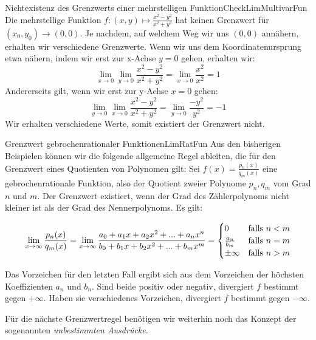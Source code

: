 \begin{example}{Nichtexistenz des Grenzwerts einer mehrstelligen Funktion}{CheckLimMultivarFun}
    Die mehrstellige Funktion $f: (x,y) \mapsto \frac{x^2-y^2}{x^2+y^2}$ hat keinen Grenzwert für $(x_0,y_0) \to (0,0)$. Je nachdem, auf welchem Weg wir uns $(0,0)$ annähern, erhalten wir verschiedene Grenzwerte. Wenn wir uns dem Koordinatenursprung etwa nähern, indem wir erst zur x-Achse $y=0$ gehen, erhalten wir:
    $$
    \lim\limits_{x\to 0} \lim\limits_{y\to 0} \frac{x^2-y^2}{x^2+y^2} = \lim\limits_{x\to 0} \frac{x^2}{x^2} = 1
    $$
    Andererseits gilt, wenn wir erst zur y-Achse $x=0$ gehen:
    $$
    \lim\limits_{y\to 0} \lim\limits_{x\to 0} \frac{x^2-y^2}{x^2+y^2} = \lim\limits_{y\to 0} \frac{-y^2}{y^2} = -1
    $$
    Wir erhalten verschiedene Werte, somit existiert der Grenzwert nicht.
\end{example}

\begin{statement}{Grenzwert gebrochenrationaler Funktionen}{LimRatFun}
    Aus den bisherigen Beispielen können wir die folgende allgemeine Regel ableiten, die für den Grenzwert eines Quotienten von Polynomen gilt:
    Sei $f(x) = \frac{p_n(x)}{q_m(x)}$ eine gebrochenrationale Funktion, also der Quotient zweier Polynome $p_n, q_m$ vom Grad $n$ und $m$. Der Grenzwert existiert, wenn der Grad des Zählerpolynoms nicht kleiner ist als der Grad des Nennerpolynoms. Es gilt:

    \begin{equation}
    \lim\limits_{x\to\infty}\frac{p_n(x)}{q_m(x)} = \lim\limits_{x\to\infty}\frac{a_0 + a_1 x + a_2 x^2 + ... + a_n x^n}{b_0 + b_1 x + b_2 x^2 + ... + b_m x^m} = \begin{cases}
    0 &\text{falls $n < m$} \\
    \frac{a_n}{b_m} &\text{falls $ n = m$} \\
    \pm \infty  &\text{falls $ n > m$}
    \end{cases}
    \end{equation}

    Das Vorzeichen für den letzten Fall ergibt sich aus dem Vorzeichen der höchsten Koeffizienten $a_n$ und $b_n$. Sind beide positiv oder negativ, divergiert $f$ bestimmt gegen $+\infty$. Haben sie verschiedenes Vorzeichen, divergiert $f$ bestimmt gegen $-\infty$.
\end{statement}

Für die nächste Grenzwertregel benötigen wir weiterhin noch das Konzept der sogenannten \emph{unbestimmten Ausdrücke}.

